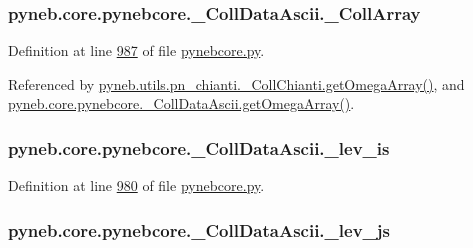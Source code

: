 \subsubsection[{\+\_\+\+Coll\+Array}]{\setlength{\rightskip}{0pt plus 5cm}pyneb.\+core.\+pynebcore.\+\_\+\+Coll\+Data\+Ascii.\+\_\+\+Coll\+Array\hspace{0.3cm}{\ttfamily [private]}}\label{classpyneb_1_1core_1_1pynebcore_1_1___coll_data_ascii_a01539063e6fade51b407dba1faa011c6}


Definition at line \hyperlink{pynebcore_8py_source_l00987}{987} of file \hyperlink{pynebcore_8py_source}{pynebcore.\+py}.



Referenced by \hyperlink{pn__chianti_8py_source_l00461}{pyneb.\+utils.\+pn\+\_\+chianti.\+\_\+\+Coll\+Chianti.\+get\+Omega\+Array()}, and \hyperlink{pynebcore_8py_source_l01039}{pyneb.\+core.\+pynebcore.\+\_\+\+Coll\+Data\+Ascii.\+get\+Omega\+Array()}.

\hypertarget{classpyneb_1_1core_1_1pynebcore_1_1___coll_data_ascii_a87c7c234487963a3d9d015294637e59a}{}
\subsubsection[{\+\_\+lev\+\_\+is}]{\setlength{\rightskip}{0pt plus 5cm}pyneb.\+core.\+pynebcore.\+\_\+\+Coll\+Data\+Ascii.\+\_\+lev\+\_\+is\hspace{0.3cm}{\ttfamily [private]}}\label{classpyneb_1_1core_1_1pynebcore_1_1___coll_data_ascii_a87c7c234487963a3d9d015294637e59a}


Definition at line \hyperlink{pynebcore_8py_source_l00980}{980} of file \hyperlink{pynebcore_8py_source}{pynebcore.\+py}.

\hypertarget{classpyneb_1_1core_1_1pynebcore_1_1___coll_data_ascii_a8c077039b4837a27b71583f26dd858a8}{}
\subsubsection[{\+\_\+lev\+\_\+js}]{\setlength{\rightskip}{0pt plus 5cm}pyneb.\+core.\+pynebcore.\+\_\+\+Coll\+Data\+Ascii.\+\_\+lev\+\_\+js\hspace{0.3cm}{\ttfamily [private]}}\label{classpyneb_1_1core_1_1pynebcore_1_1___coll_data_ascii_a8c077039b4837a27b71583f26dd858a8}


